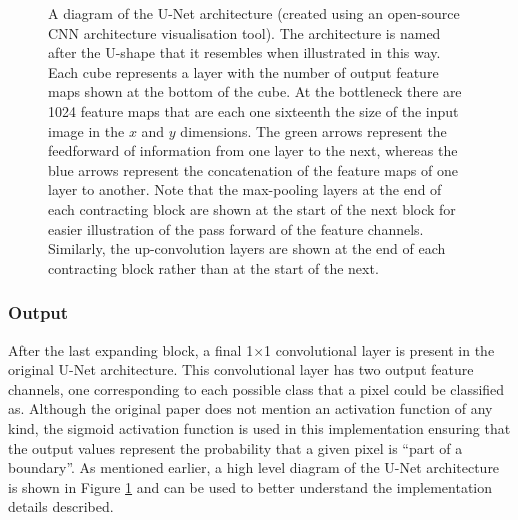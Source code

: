 \begin{figure}[!t]
    \centering
    \hspace*{-0.3cm}
    
    \caption[A diagram of the U-Net architecture (created using an open-source CNN architecture visualisation tool). The architecture is named after the U-shape that it resembles when illustrated in this way. Each cube represents a layer with the number of output feature maps shown at the bottom of the cube. At the bottleneck there are 1024 feature maps that are each one sixteenth the size of the input image in the $x$ and $y$ dimensions. The green arrows represent the feedforward of information from one layer to the next, whereas the blue arrows represent the concatenation of the feature maps of one layer to another. Note that the max-pooling layers at the end of each contracting block are shown at the start of the next block for easier illustration of the pass forward of the feature channels. Similarly, the up-convolution layers are shown at the end of each contracting block rather than at the start of the next.]{A diagram of the U-Net architecture (created using an open-source CNN architecture visualisation tool\footnotemark). The architecture is named after the U-shape that it resembles when illustrated in this way. Each cube represents a layer with the number of output feature maps shown at the bottom of the cube. At the bottleneck there are 1024 feature maps that are each one sixteenth the size of the input image in the $x$ and $y$ dimensions. The green arrows represent the feedforward of information from one layer to the next, whereas the blue arrows represent the concatenation of the feature maps of one layer to another. Note that the max-pooling layers at the end of each contracting block are shown at the start of the next block for easier illustration of the pass forward of the feature channels. Similarly, the up-convolution layers are shown at the end of each contracting block rather than at the start of the next.}
    \label{fig:unetushape}
\end{figure}

\subsubsection{Output}


After the last expanding block, a final 1$\times$1 convolutional layer is present in the original U-Net architecture. This convolutional layer has two output feature channels, one corresponding to each possible class that a pixel could be classified as. Although the original paper does not mention an activation function of any kind, the sigmoid activation function is used in this implementation ensuring that the output values represent the probability that a given pixel is ``part of a boundary''. As mentioned earlier, a high level diagram of the U-Net architecture is shown in Figure \ref{fig:unetushape} and can be used to better understand the implementation details described.

